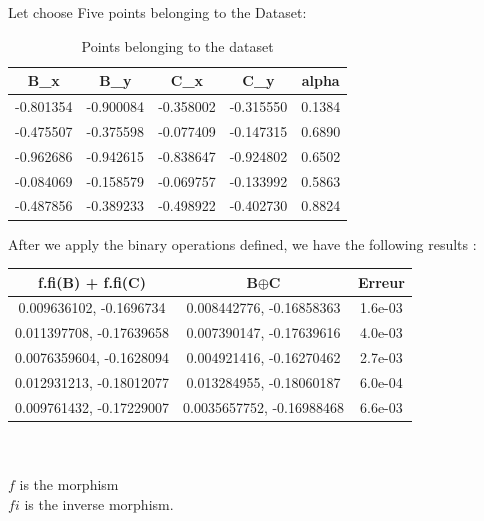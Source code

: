 \documentclass{report}
\begin{document}
            Let choose Five points belonging to the Dataset: \\
            \begin{table}[h]
                \centering
                \begin{tabular}{|c|c|c|c|c|}
                \hline
                B\_x & B\_y & C\_x & C\_y & alpha \\
                \hline
                -0.801354 & -0.900084 & -0.358002 & -0.315550 & 0.1384 \\
                -0.475507 & -0.375598 & -0.077409 & -0.147315 & 0.6890 \\
                -0.962686 & -0.942615 & -0.838647 & -0.924802 & 0.6502 \\
                -0.084069 & -0.158579 & -0.069757 & -0.133992 & 0.5863 \\
                -0.487856 & -0.389233 & -0.498922 & -0.402730 & 0.8824 \\
                \hline
                \end{tabular}
                \caption{Points belonging to the dataset}
                \end{table}
            


            \newpage
            After we apply the binary operations defined, we have the following results :\\

            \begin{tabular}{|c|c|c|}
                \hline
                f.fi(B) + f.fi(C) & B$\oplus$C & Erreur \\
                \hline
                0.009636102, -0.1696734 & 0.008442776, -0.16858363 & 1.6e-03 \\
                0.011397708, -0.17639658 & 0.007390147, -0.17639616 & 4.0e-03 \\
                0.0076359604, -0.1628094 & 0.004921416, -0.16270462 & 2.7e-03 \\
                0.012931213, -0.18012077 & 0.013284955, -0.18060187 & 6.0e-04 \\
                0.009761432, -0.17229007 & 0.0035657752, -0.16988468 & 6.6e-03 \\
                \hline
            \end{tabular}
            \\
            \\
            $f$ is the morphism \\
            $fi$ is the inverse morphism.
\end{document}

